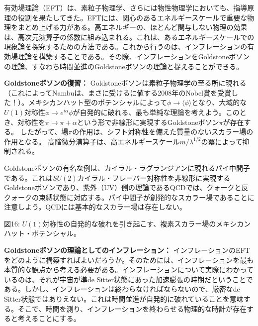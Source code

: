 
有効場理論（EFT）は、素粒子物理学、さらには物性物理学においても、指導原理の役割を果たしてきた。EFTには、関心のあるエネルギースケールで重要な物理をまとめ上げる力がある。高エネルギーの、ほとんど関与しない物理の効果は、高次元演算子の係数に組み込まれる。これは、あるエネルギースケールでの現象論を探究するための方法である。これから行うのは、インフレーションの有効場理論を構築することである。その際、インフレーションをGoldstoneボソンの理論、すなわち時間並進のGoldstoneボソンの理論と捉えることができる。

\textbf{Goldstoneボソンの復習：}
Goldstoneボソンは素粒子物理学の至る所に現れる（これによってNambuは、まさに受けるに値する2008年のNobel賞を受賞した！）。メキシカンハット型のポテンシャルによって$\phi\to\langle\phi\rangle$となり、大域的な$U(1)$対称性$\phi\to e^{i\alpha}\phi$が自発的に破れる、最も単純な理論を考えよう。このとき、対称性を$\pi\to\pi+\alpha$という形で非線形に実現するGoldstoneボソン$\pi$が存在する。
したがって、場$\pi$の作用は、シフト対称性を備えた質量のないスカラー場の作用となる。
高階微分演算子は、高エネルギースケール$m/\lambda^{1/2}$の冪によって抑制される。

Goldstoneボソンの有名な例は、カイラル・ラグランジアンに現れるパイ中間子である。これは$SU(2)$カイラル・フレーバー対称性を非線形に実現するGoldstoneボソンであり、紫外（UV）側の理論であるQCDでは、クォークと反クォークの束縛状態に対応する。パイ中間子が創発的なスカラー場であることに注意しよう。QCDには基本的なスカラー場は存在しない。

\noindent\begin{minipage}{\linewidth}
\begin{center}
図16: $U(1)$対称性の自発的な破れを引き起こす、複素スカラー場のメキシカンハット・ポテンシャル。
\end{center}
\end{minipage}\par\medskip

\textbf{Goldstoneボソンの理論としてのインフレーション：}
インフレーションのEFTをどのように構築すればよいだろうか。そのためには、インフレーションを最も本質的な観点から考える必要がある。インフレーションについて実際にわかっているのは、それが宇宙が準de Sitter状態にあった加速膨張の時期だということである。しかし、インフレーションは終わらなければならないので、厳密なde Sitter状態ではありえない。これは時間並進が自発的に破れていることを意味する。そこで、時間を測り、インフレーションを終わらせる物理的な時計が存在すると考えることにする。

